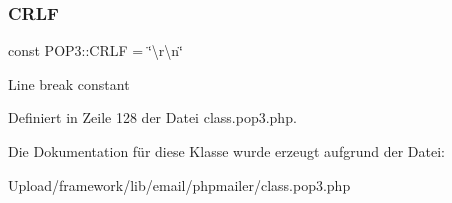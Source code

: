 \subsubsection{\texorpdfstring{C\+R\+LF}{CRLF}}
{\footnotesize\ttfamily const P\+O\+P3\+::\+C\+R\+LF = \char`\"{}\textbackslash{}r\textbackslash{}n\char`\"{}}

Line break constant 

Definiert in Zeile 128 der Datei class.\+pop3.\+php.



Die Dokumentation für diese Klasse wurde erzeugt aufgrund der Datei\+:\begin{DoxyCompactItemize}
\item 
Upload/framework/lib/email/phpmailer/class.\+pop3.\+php\end{DoxyCompactItemize}
